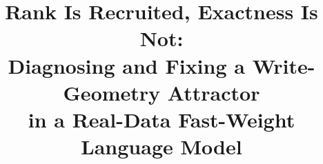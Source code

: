 \documentclass{article}
\title{Rank Is Recruited, Exactness Is Not: \\
Diagnosing and Fixing a Write-Geometry Attractor \\
in a Real-Data Fast-Weight Language Model}
\theoremstyle{plain}
\theoremstyle{definition}
\begin{document}
\maketitle

\begin{abstract}

\end{abstract}
















\appendix


\end{document}
